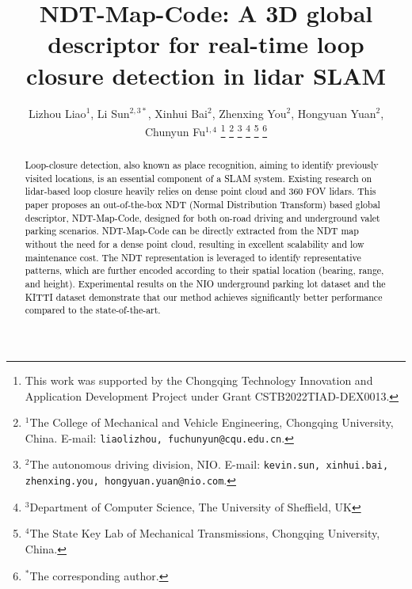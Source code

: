 \documentclass[letterpaper, 10 pt, conference]{ieeeconf}   %
\title{\LARGE \bf
NDT-Map-Code: A 3D global descriptor for real-time loop closure detection in lidar SLAM
}
\author{Lizhou Liao$^{1}$, Li Sun$^{2,3*}$, Xinhui Bai$^{2}$, Zhenxing You$^{2}$, Hongyuan Yuan$^{2}$, Chunyun Fu$^{1,4}$%
\thanks{This work was supported by the Chongqing Technology Innovation and Application Development Project under Grant CSTB2022TIAD-DEX0013.}%
\thanks{$^{1}$The College of Mechanical and Vehicle Engineering, Chongqing University, China. E-mail: 
        {\tt\small liaolizhou, fuchunyun@cqu.edu.cn}.}%
\thanks{$^{2}$The autonomous driving division, NIO.  E-mail: 
        {\tt\small kevin.sun, xinhui.bai, zhenxing.you, hongyuan.yuan@nio.com}.}%
\thanks{$^{3}$Department of Computer Science, The University of Sheffield, UK}
\thanks{$^{4}$The State Key Lab of Mechanical Transmissions, Chongqing University, China.}
\thanks{$^{*}$The corresponding author.}
}
\newcommand\kevin[1]{\textcolor{black}{#1}}
\begin{document}
\maketitle
\thispagestyle{empty}
\pagestyle{empty}


\begin{abstract}

\kevin{Loop-closure detection, also known as place recognition, aiming to identify previously visited locations, is an essential component of a SLAM system. Existing research on lidar-based loop closure heavily relies on dense point cloud and 360 FOV lidars. This paper proposes an out-of-the-box NDT (Normal Distribution Transform) based global descriptor, NDT-Map-Code, designed for both on-road driving and underground valet parking scenarios. NDT-Map-Code can be directly extracted from the NDT map without the need for a dense point cloud, resulting in excellent scalability and low maintenance cost. The NDT representation is leveraged to identify representative patterns, which are further encoded according to their spatial location (bearing, range, and height). Experimental results on the NIO underground parking lot dataset and the KITTI dataset demonstrate that our method achieves significantly better performance compared to the state-of-the-art.}

\end{abstract}
\end{document}

